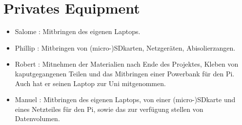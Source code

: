 \documentclass{article}
\begin{document}
\section{Privates Equipment}

\begin{itemize}

\item Salome : Mitbringen des eigenen Laptops.

\item Phillip : Mitbringen von (micro-)SDkarten, Netzger\"{a}ten, Abisolierzangen.

\item Robert : Mitnehmen der Materialien nach Ende des Projektes, Kleben von kaputgegangenen Teilen und das Mitbringen einer Powerbank f\"{u}r den Pi. Auch hat er seinen Laptop zur Uni mitgenommen.

\item Manuel : Mitbringen des eigenen Laptops, von einer (micro-)SDkarte und eines Netzteiles f\"{u}r den Pi, sowie das zur verf\"{u}gung stellen von Datenvolumen.

\end{itemize}
\end{document}
